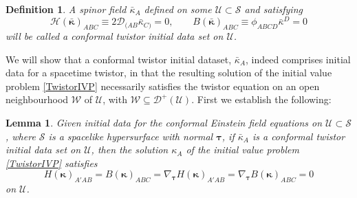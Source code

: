 \documentclass[10pt,a4paper]{article}
\theoremstyle{plain}
\newtheorem{lemma}{Lemma}
\newtheorem*{definition}{Definition}
\begin{document}
\begin{definition}{\em
A spinor field $\bar{\kappa}_A$ defined on some
$\mathcal{U}\subset\mathcal{S}$ and satisfying
\begin{equation}
    \mathcal{H}(\bar{\bm\kappa})_{ABC}\equiv
    2\mathcal{D}_{(AB}\bar{\kappa}_{C)}=0,\qquad
    B(\bar{\bm\kappa})_{ABC}\equiv
    \phi_{ABCD}\bar{\kappa}^D=0 \label{twistor_CSKIDs}
\end{equation}
will be called a \emph{conformal twistor initial data set} on
$\mathcal{U}$.}
\end{definition}
We will show that a conformal twistor initial dataset,
$\bar{\kappa}_A$, indeed comprises initial data for a spacetime
twistor, in that the resulting solution of the initial value problem \eqref{TwistorIVP}
necessarily satisfies the twistor equation on an open neighbourhood $\mathcal{W}$
of $\mathcal{U}$, with $\mathcal{W}\subseteq\mathcal{D}^+(\mathcal{U})$.
First we establish the following:
\begin{lemma}\label{lemma:twistor_removing_redundancy}
  Given initial data for the conformal Einstein field equations on
  $\mathcal{U}\subset\mathcal{S}$, where $\mathcal{S}$ is a spacelike
  hypersurface with normal $\bm\tau$, if $\bar{\kappa}_A$ is a
  conformal twistor initial data set on $\mathcal{U}$, then the
  solution $\kappa_A$ of the initial value problem \eqref{TwistorIVP}
  satisfies
\[H(\bm\kappa)_{A'AB}=B(\bm\kappa)_{ABC}=\nabla_{\bm\tau}H(\bm\kappa)_{A'AB}=\nabla_{\bm\tau}B(\bm\kappa)_{ABC}=0 \]
on $\mathcal{U}$.
\end{lemma}
\end{document}
